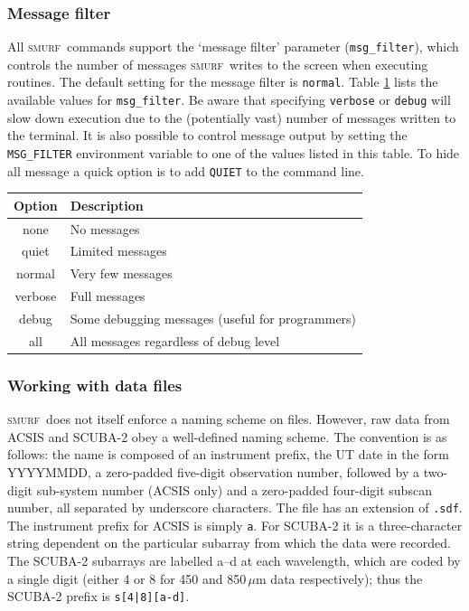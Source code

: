 \documentclass[twoside,11pt]{article}
\newcommand{\xlabel}[1]{}
\renewcommand{\_}{\texttt{\symbol{95}}}
\newcommand{\SMURF}{\textsc{smurf}}
\begin{document}
\subsubsection{Message filter}

All \SMURF\ commands support the `message filter' parameter
(\verb+msg_filter+), which controls the number of messages \SMURF\
writes to the screen when executing routines. The default setting for
the message filter is \verb+normal+. Table \ref{tab:msgfilter} lists
the available values for \verb+msg_filter+. Be aware that specifying
\verb+verbose+ or \verb+debug+ will slow down execution due to the
(potentially vast) number of messages written to the terminal. It is
also possible to control message output by setting the
\verb+MSG_FILTER+ environment variable to one of the values listed in
this table. To hide all message a quick option is to add \verb+QUIET+
to the command line.

\begin{table}
\centering
\begin{tabular}{|c|l|}
\hline
Option  & Description \\
\hline
none    & No messages \\
quiet   & Limited messages \\
normal  & Very few messages \\
verbose & Full messages \\
debug   & Some debugging messages (useful for programmers) \\
all     & All messages regardless of debug level \\
\hline
\end{tabular}
\label{tab:msgfilter}
\end{table}

\subsubsection{\xlabel{files}Working with data files\label{se:files}}

\SMURF\ does not itself enforce a naming scheme on files. However, raw
data from ACSIS and SCUBA-2 obey a well-defined naming scheme. The
convention is as follows: the name is composed of an instrument
prefix, the UT date in the form YYYYMMDD, a zero-padded five-digit
observation number, followed by a two-digit sub-system number (ACSIS
only) and a zero-padded four-digit subscan number, all separated by
underscore characters. The file has an extension of \verb+.sdf+. The
instrument prefix for ACSIS is simply \verb+a+. For SCUBA-2 it is a
three-character string dependent on the particular subarray from which
the data were recorded. The SCUBA-2 subarrays are labelled a--d at
each wavelength, which are coded by a single digit (either 4 or 8 for
450 and 850\,$\mu$m data respectively); thus the SCUBA-2 prefix is
\verb+s[4|8][a-d]+.
\end{document}

